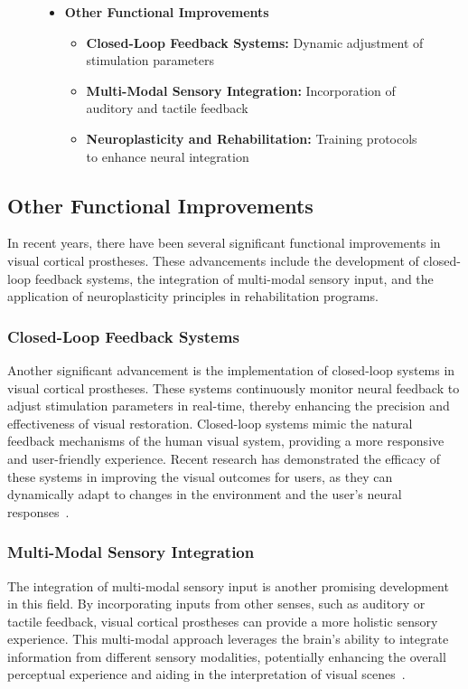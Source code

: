 \documentclass[twocolumn,10pt]{article}
\begin{document}
\begin{figure}[htbp]
\begin{tcolorbox}
\begin{itemize}
                  \item \textbf{Other Functional Improvements}
                        \begin{itemize}
                              \item \textbf{Closed-Loop Feedback Systems:} Dynamic adjustment of stimulation parameters
                              \item \textbf{Multi-Modal Sensory Integration:} Incorporation of auditory and tactile feedback
                              \item \textbf{Neuroplasticity and Rehabilitation:} Training protocols to enhance neural integration
                        \end{itemize}
            \end{itemize}
      \end{tcolorbox}
\end{figure}


\subsection{Other Functional Improvements}
In recent years, there have been several significant functional improvements in
visual cortical prostheses. These advancements include the development of
closed-loop feedback systems, the integration of multi-modal sensory input, and
the application of neuroplasticity principles in rehabilitation programs.

\subsubsection*{Closed-Loop Feedback Systems}
Another significant advancement is the implementation of closed-loop systems in
visual cortical prostheses. These systems continuously monitor neural feedback
to adjust stimulation parameters in real-time, thereby enhancing the precision
and effectiveness of visual restoration. Closed-loop systems mimic the natural
feedback mechanisms of the human visual system, providing a more responsive and
user-friendly experience. Recent research has demonstrated the efficacy of these
systems in improving the visual outcomes for users, as they can dynamically
adapt to changes in the environment and the user's neural
responses~\cite{leviEditorialClosedLoopSystems2018}.

\subsubsection*{Multi-Modal Sensory Integration}
The integration of multi-modal sensory input is another promising development in
this field. By incorporating inputs from other senses, such as auditory or
tactile feedback, visual cortical prostheses can provide a more holistic sensory
experience. This multi-modal approach leverages the brain's ability to integrate
information from different sensory modalities, potentially enhancing the overall
perceptual experience and aiding in the interpretation of visual
scenes~\cite{wanArtificialSensoryNeuron2020}.
\end{document}
